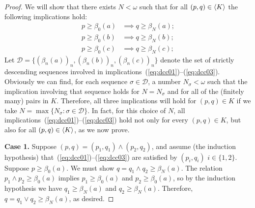 \begin{proof}
We will show that there exists $N < \omega$ such that 
for all $(p, q) \in \langle K\rangle$ 
the following implications hold:
\begin{align}
  p \geq \beta_0(a) &\implies q \geq \beta_N(a); \label{eq:dcc01}\\
  p \geq \beta_0(b) &\implies q \geq \beta_N(b); \label{eq:dcc02}\\ 
  p \geq \beta_0(c) &\implies q \geq \beta_N(c); \label{eq:dcc03}
\end{align}
Let $\mathcal D = \{(\beta_n(a))_n, (\beta_n(b))_n, (\beta_n(c))_n\}$
denote the set of strictly descending 
sequences involved in implications~(\ref{eq:dcc01})--(\ref{eq:dcc03}).
Obviously we can find, for each sequence $\sigma \in \mathcal D$,
a number $N_\sigma < \omega$ such that the implication involving that sequence 
holds for $N = N_\sigma$ and for all of the (finitely many) pairs in $K$.  
Therefore, all three implications will hold for $(p, q) \in K$ if we take 
$N = \max \{N_{\sigma} : \sigma \in \mathcal D\}$.
In fact, for this choice of $N$, all implications~(\ref{eq:dcc01})--(\ref{eq:dcc03}) hold 
not only for every $(p, q) \in K$, but also for all $(p, q) \in \langle K\rangle$,
as we now prove.

  
    
    \medskip
    \noindent \textbf{Case 1.}
    Suppose $(p,q) = (p_1, q_1) \wedge (p_2, q_2)$, and assume (the induction hypothesis) 
    that~(\ref{eq:dcc01})--(\ref{eq:dcc03}) are satisfied 
    by $(p_i,q_i)$ $i\in \{1,2\}$.
    Suppose $p \geq \beta_0(a)$. We must show $q=q_1\wedge q_2 \geq \beta_N(a)$.
    The relation $p_1\wedge p_2 \geq \beta_0(a)$ implies 
    $p_1\geq \beta_0(a)$ and $p_2\geq \beta_0(a)$, 
    so by the induction hypothesis we have 
    $q_1\geq \beta_N(a)$ and $q_2\geq \beta_N(a)$.  
    Therefore, $q = q_1 \vee q_2 \geq \beta_N(a)$, as desired.
    


\end{proof}
